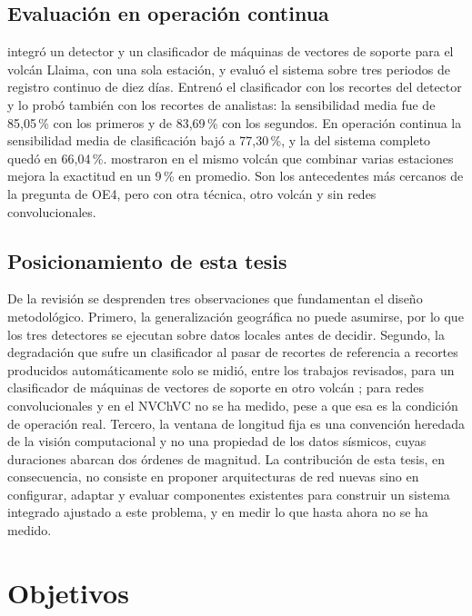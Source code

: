 \subsection{Evaluación en operación continua}

\textcite{soto2016llaima} integró un detector y un clasificador de máquinas de
vectores de soporte para el volcán Llaima, con una sola estación, y evaluó el
sistema sobre tres periodos de registro continuo de diez días. Entrenó el
clasificador con los recortes del detector y lo probó también con los recortes
de analistas: la sensibilidad media fue de 85,05\,\% con los primeros y de
83,69\,\% con los segundos. En operación continua la sensibilidad media de
clasificación bajó a 77,30\,\%, y la del sistema completo quedó en 66,04\,\%.
\textcite{curilem2016estaciones} mostraron en el mismo volcán que combinar
varias estaciones mejora la exactitud en un 9\,\% en promedio. Son los
antecedentes más cercanos de la pregunta de OE4, pero con otra técnica, otro
volcán y sin redes convolucionales.

\subsection{Posicionamiento de esta tesis}

De la revisión se desprenden tres observaciones que fundamentan el diseño
metodológico. Primero, la generalización geográfica no puede asumirse, por lo
que los tres detectores se ejecutan sobre datos locales antes de decidir.
Segundo, la degradación que sufre un clasificador al pasar de recortes de
referencia a recortes producidos automáticamente solo se midió, entre los
trabajos revisados, para un clasificador de máquinas de vectores de soporte en
otro volcán \parencite{soto2016llaima}; para redes convolucionales y en el
NVChVC no se ha medido, pese a que esa es la condición de operación real. Tercero, la ventana de longitud
fija es una convención heredada de la visión computacional y no una propiedad
de los datos sísmicos, cuyas duraciones abarcan dos órdenes de magnitud. La
contribución de esta tesis, en consecuencia, no consiste en proponer
arquitecturas de red nuevas sino en configurar, adaptar y evaluar componentes
existentes para construir un sistema integrado ajustado a este problema, y en
medir lo que hasta ahora no se ha medido.

\section{Objetivos}
\label{sec:objetivos}

